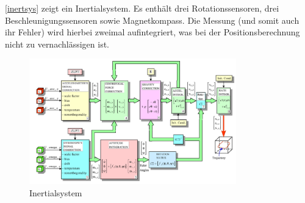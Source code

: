 \autoref{inertsys}  zeigt ein Inertialsystem. Es enthält drei Rotationssensoren, drei Beschleunigungssensoren sowie Magnetkompass. Die Messung (und somit auch ihr
Fehler) wird hierbei zweimal aufintegriert, was bei der Positionsberechnung nicht zu vernachlässigen ist.
\begin{figure}[h!]
	\centering
	\includegraphics[width=0.8\textwidth]{figures/ch04_inertsys.png}
	\caption{Inertialsystem}
	\label{inertsys}
\end{figure}

